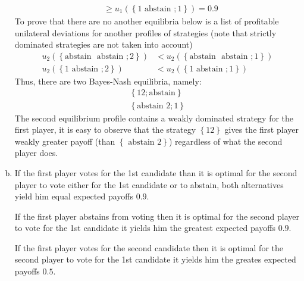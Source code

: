 \documentclass[a4paper]{article}
\begin{document}
\begin{enumerate}[(a)]
\begin{align*}
	&\ge u_1(\left\{1\text{ abstain }; 1 \right\}) = 0.9
	\end{align*}
	 To prove that there are no another equilibria below is a list of profitable unilateral deviations for another profiles of strategies (note that strictly dominated strategies are not taken into account)
	\begin{align*}
	u_2(\left\{\text{abstain } \text{ abstain }; 2 \right\}) &< u_2(\left\{\text{abstain } \text{ abstain }; 1 \right\})\\
	u_2(\left\{1 \text{ abstain }; 2 \right\}) &< u_2(\left\{1 \text{ abstain }; 1 \right\})
	\end{align*}
	Thus, there are two Bayes-Nash equilibria, namely:
	\begin{align*}
	\left\{12; \text{abstain}\right\}\\
	\left\{\text{abstain } 2; 1 \right\}
	\end{align*}
	The second equilibrium profile contains a weakly dominated strategy for the first player, it is easy to observe that the strategy $\left\{12\right\}$ gives the first player weakly greater payoff (than $\left\{\text{ abstain } 2\right\}$) regardless of what the second player does.
	
	\item If the first player votes for the 1st candidate than it is optimal for the second player to vote either for the 1st candidate or to abstain, both alternatives yield him equal expected payoffs $0.9$.
	
	If the first player abstains from voting then it is optimal for the second player to vote for the 1st candidate it yields him the greatest expected payoffs $0.9$.
	
	If the first player votes for the second candidate then it is optimal for the second player to vote for the 1st candidate it yields him the greates expected payoffs $0.5$.
	

\end{enumerate}
\end{document}
